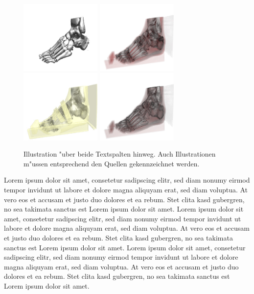 \documentclass[journal]{vgtc}
\begin{document}
\begin{figure}[tb]
  \centering
  \includegraphics[width=4cm]{images/foot1}\hfill
  \includegraphics[width=4cm]{images/foot2}\hfill
  \includegraphics[width=4cm]{images/foot3}\hfill
  \includegraphics[width=4cm]{images/foot4}
  \caption{Illustration "uber beide Textspalten hinweg. Auch
    Illustrationen m"ussen entsprechend den Quellen gekennzeichnet
    werden. \cite{strengert2006spectral}}
  \label{fig:multicolumn}
\end{figure}


Lorem ipsum dolor sit amet, consetetur sadipscing elitr, sed diam
nonumy eirmod tempor invidunt ut labore et dolore magna aliquyam erat,
sed diam voluptua. At vero eos et accusam et justo duo dolores et ea
rebum. Stet clita kasd gubergren, no sea takimata sanctus est Lorem
ipsum dolor sit amet. Lorem ipsum dolor sit amet, consetetur
sadipscing elitr, sed diam nonumy eirmod tempor invidunt ut labore et
dolore magna aliquyam erat, sed diam voluptua. At vero eos et accusam
et justo duo dolores et ea rebum. Stet clita kasd gubergren, no sea
takimata sanctus est Lorem ipsum dolor sit amet. Lorem ipsum dolor sit
amet, consetetur sadipscing elitr, sed diam nonumy eirmod tempor
invidunt ut labore et dolore magna aliquyam erat, sed diam
voluptua. At vero eos et accusam et justo duo dolores et ea
rebum. Stet clita kasd gubergren, no sea takimata sanctus est Lorem
ipsum dolor sit amet.
\end{document}
